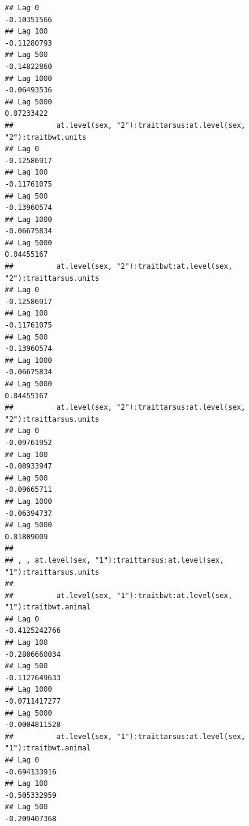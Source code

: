 \documentclass[
  12pt,
]{book}
\begin{document}
\begin{verbatim}
## Lag 0                                                      -0.10351566
## Lag 100                                                    -0.11280793
## Lag 500                                                    -0.14822860
## Lag 1000                                                   -0.06493536
## Lag 5000                                                    0.07233422
##          at.level(sex, "2"):traittarsus:at.level(sex, "2"):traitbwt.units
## Lag 0                                                         -0.12586917
## Lag 100                                                       -0.11761075
## Lag 500                                                       -0.13960574
## Lag 1000                                                      -0.06675834
## Lag 5000                                                       0.04455167
##          at.level(sex, "2"):traitbwt:at.level(sex, "2"):traittarsus.units
## Lag 0                                                         -0.12586917
## Lag 100                                                       -0.11761075
## Lag 500                                                       -0.13960574
## Lag 1000                                                      -0.06675834
## Lag 5000                                                       0.04455167
##          at.level(sex, "2"):traittarsus:at.level(sex, "2"):traittarsus.units
## Lag 0                                                            -0.09761952
## Lag 100                                                          -0.08933947
## Lag 500                                                          -0.09665711
## Lag 1000                                                         -0.06394737
## Lag 5000                                                          0.01809009
## 
## , , at.level(sex, "1"):traittarsus:at.level(sex, "1"):traittarsus.units
## 
##          at.level(sex, "1"):traitbwt:at.level(sex, "1"):traitbwt.animal
## Lag 0                                                     -0.4125242766
## Lag 100                                                   -0.2806660034
## Lag 500                                                   -0.1127649633
## Lag 1000                                                  -0.0711417277
## Lag 5000                                                  -0.0004811528
##          at.level(sex, "1"):traittarsus:at.level(sex, "1"):traitbwt.animal
## Lag 0                                                         -0.694133916
## Lag 100                                                       -0.505332959
## Lag 500                                                       -0.209407368

\end{verbatim}
\end{document}
